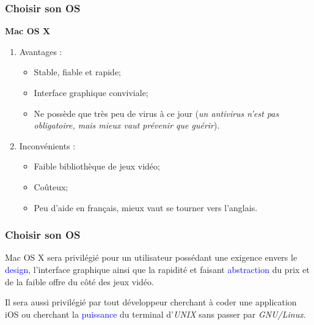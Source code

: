 \documentclass[aspectratio=169]{beamer}
\begin{document}
\begin{frame}
  \frametitle{Choisir son OS}
  \textbf{Mac OS X}

  \hspace{0.5cm}

  \begin{enumerate}
  \item Avantages :

    \begin{itemize}
    \item Stable, fiable et rapide;

    \item Interface graphique conviviale;

    \item Ne possède que très peu de virus à ce jour (\textit{un antivirus
      n'est pas obligatoire, mais mieux vaut prévenir que guérir}).
    \end{itemize}

  \item Inconvénients :

    \begin{itemize}
    \item Faible bibliothèque de jeux vidéo;

    \item Coûteux;

    \item Peu d'aide en français, mieux vaut se tourner vers l'anglais.
    \end{itemize}
  \end{enumerate}
\end{frame}

\begin{frame}
  \frametitle{Choisir son OS}
  Mac OS X sera privilégié pour un utilisateur possédant une exigence envers le
  \textcolor{blue}{design}, l'interface graphique ainsi que la rapidité et
  faisant \textcolor{blue}{abstraction} du prix et de la faible offre du côté
  des jeux vidéo.

  \hspace{0.5cm}

  Il sera aussi privilégié par tout développeur cherchant à coder une
  application iOS ou cherchant la \textcolor{blue}{puissance} du terminal
  d'\textit{UNIX} sans passer par \textit{GNU/Linux}.

\end{frame}
\end{document}
